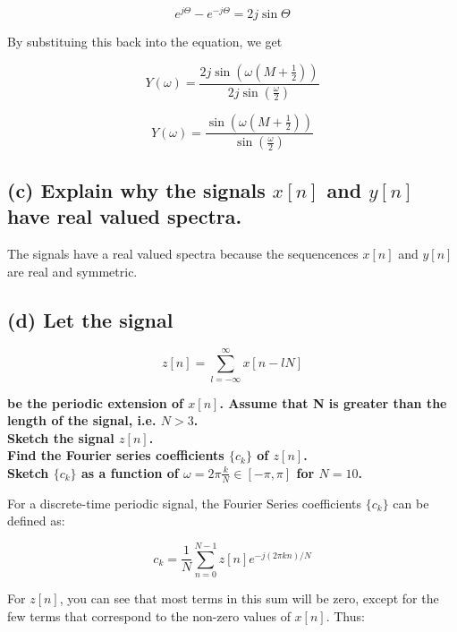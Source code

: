 \begin{equation*}
    e^{j\Theta}-e^{-j\Theta}= 2j\sin{\Theta}
\end{equation*}

By substituing this back into the equation, we get

\begin{equation*}
    Y(\omega)=\frac{2j\sin \left(\omega\left(M+\frac{1}{2}\right)\right)}{2j\sin \left(\frac{\omega}{2}\right)} 
\end{equation*}


\begin{equation*}
    Y(\omega)=\frac{\sin \left(\omega\left(M+\frac{1}{2}\right)\right)}{\sin \left(\frac{\omega}{2}\right)} 
\end{equation*}


\subsection*{(c) Explain why the signals $x[n]$ and $y[n]$ have real valued spectra.}

The signals have a real valued spectra because the sequencences $x[n]$ and $y[n]$ are real and symmetric.

\subsection*{(d) Let the signal}

\begin{equation*}
    z[n]=\sum_{l=-\infty}^{\infty} x[n-l N] 
\end{equation*}

\textbf{be the periodic extension of $x[n]$. Assume that N is greater than the length of the signal, i.e. $N > 3$.\\Sketch the signal $z[n]$.\\ Find the Fourier series coefficients $\{c_k\}$ of $z[n]$.\\ Sketch $\{c_k\}$ as a function of $\omega=2\pi \frac{k}{N}\in [-\pi,\pi]$ for $N=10$.}

For a discrete-time periodic signal, the Fourier Series coefficients $\{c_k\}$ can be defined as:

\begin{equation*}
    c_{k}=\frac{1}{N} \sum_{n=0}^{N-1} z[n] e^{-j(2 \pi k n) / N} 
\end{equation*}

For $z[n]$, you can see that most terms in this sum will be zero, except for the few terms that correspond to the non-zero values of $x[n]$. Thus:

